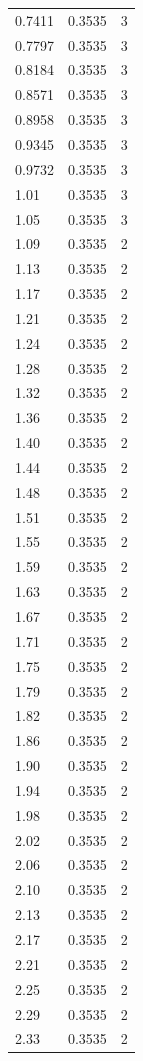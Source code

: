 \begin{longtable}{lrr}
  0.7411 & 0.3535 & 3 \\
  0.7797 & 0.3535 & 3 \\
  0.8184 & 0.3535 & 3 \\
  0.8571 & 0.3535 & 3 \\
  0.8958 & 0.3535 & 3 \\
  0.9345 & 0.3535 & 3 \\
  0.9732 & 0.3535 & 3 \\
  1.01 & 0.3535 & 3 \\
  1.05 & 0.3535 & 3 \\
  1.09 & 0.3535 & 2 \\
  1.13 & 0.3535 & 2 \\
  1.17 & 0.3535 & 2 \\
  1.21 & 0.3535 & 2 \\
  1.24 & 0.3535 & 2 \\
  1.28 & 0.3535 & 2 \\
  1.32 & 0.3535 & 2 \\
  1.36 & 0.3535 & 2 \\
  1.40 & 0.3535 & 2 \\
  1.44 & 0.3535 & 2 \\
  1.48 & 0.3535 & 2 \\
  1.51 & 0.3535 & 2 \\
  1.55 & 0.3535 & 2 \\
  1.59 & 0.3535 & 2 \\
  1.63 & 0.3535 & 2 \\
  1.67 & 0.3535 & 2 \\
  1.71 & 0.3535 & 2 \\
  1.75 & 0.3535 & 2 \\
  1.79 & 0.3535 & 2 \\
  1.82 & 0.3535 & 2 \\
  1.86 & 0.3535 & 2 \\
  1.90 & 0.3535 & 2 \\
  1.94 & 0.3535 & 2 \\
  1.98 & 0.3535 & 2 \\
  2.02 & 0.3535 & 2 \\
  2.06 & 0.3535 & 2 \\
  2.10 & 0.3535 & 2 \\
  2.13 & 0.3535 & 2 \\
  2.17 & 0.3535 & 2 \\
  2.21 & 0.3535 & 2 \\
  2.25 & 0.3535 & 2 \\
  2.29 & 0.3535 & 2 \\
  2.33 & 0.3535 & 2 \\

\end{longtable}
